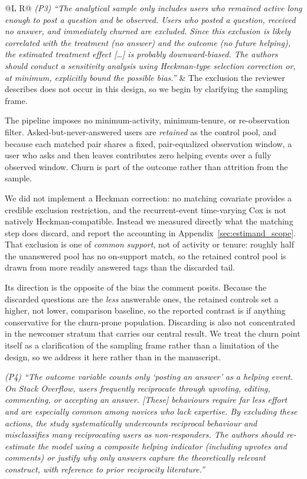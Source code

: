 \documentclass[11pt]{article}
\begin{document}
\begin{longtable}{@{}L R@{}}
\textit{(P3) ``The analytical sample only includes users who remained active long enough to post a question and be observed. Users who posted a question, received no answer, and immediately churned are excluded. Since this exclusion is likely correlated with the treatment (no answer) and the outcome (no future helping), the estimated treatment effect [\ldots] is probably downward-biased. The authors should conduct a sensitivity analysis using Heckman-type selection correction or, at minimum, explicitly bound the possible bias.''} &
The exclusion the reviewer describes does not occur in this design, so we begin by clarifying the sampling frame.

The pipeline imposes no minimum-activity, minimum-tenure, or re-observation filter. Asked-but-never-answered users are \emph{retained} as the control pool, and because each matched pair shares a fixed, pair-equalized observation window, a user who asks and then leaves contributes zero helping events over a fully observed window. Churn is part of the outcome rather than attrition from the sample.

We did not implement a Heckman correction: no matching covariate provides a credible exclusion restriction, and the recurrent-event time-varying Cox is not natively Heckman-compatible. Instead we measured directly what the matching step does discard, and report the accounting in Appendix~\ref{sec:estimand_scope}. That exclusion is one of \emph{common support}, not of activity or tenure: roughly half the unanswered pool has no on-support match, so the retained control pool is drawn from more readily answered tags than the discarded tail.

Its direction is the opposite of the bias the comment posits. Because the discarded questions are the \emph{less} answerable ones, the retained controls set a higher, not lower, comparison baseline, so the reported contrast is if anything conservative for the churn-prone population. Discarding is also not concentrated in the newcomer stratum that carries our central result. We treat the churn point itself as a clarification of the sampling frame rather than a limitation of the design, so we address it here rather than in the manuscript. \\
\midrule

\textit{(P4) ``The outcome variable counts only `posting an answer' as a helping event. On Stack Overflow, users frequently reciprocate through upvoting, editing, commenting, or accepting an answer. [These] behaviours require far less effort and are especially common among novices who lack expertise. By excluding these actions, the study systematically undercounts reciprocal behaviour and misclassifies many reciprocating users as non-responders. The authors should re-estimate the model using a composite helping indicator (including upvotes and comments) or justify why only answers capture the theoretically relevant construct, with reference to prior reciprocity literature.''}


\end{longtable}
\end{document}
